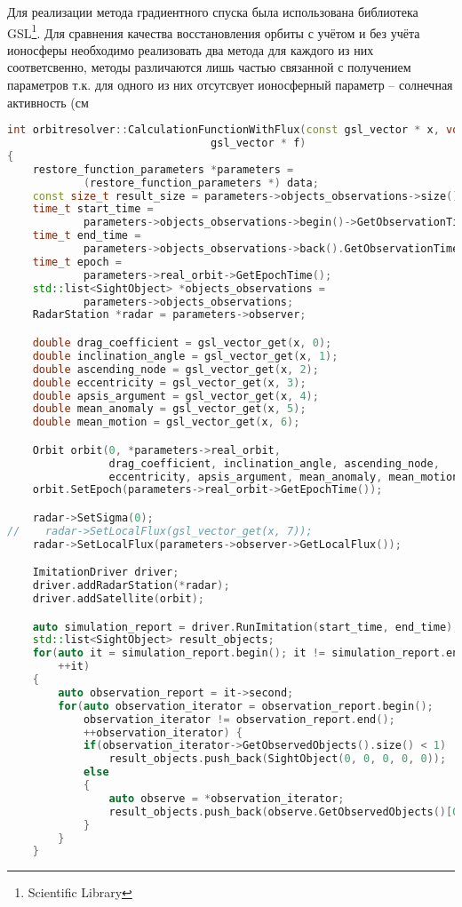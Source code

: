 Для реализации метода градиентного спуска была использована библиотека GSL\footnote{Scientific Library}. Для 
сравнения качества восстановления орбиты с учётом и без учёта ионосферы необходимо реализовать два метода для 
каждого из них соответсвенно, методы различаются лишь частью связанной с получением параметров т.к. для одного из
них отсутсвует ионосферный параметр -- солнечная активность (см
\begin{lstlisting}[language=C++, basicstyle=\fontsize{10}{9}\ttfamily,
	caption={Добавление случайной велечины к измеренной},label={lst:RandomizeValue}]
int orbitresolver::CalculationFunctionWithFlux(const gsl_vector * x, void *data,
                                gsl_vector * f)
{
    restore_function_parameters *parameters =
            (restore_function_parameters *) data;
    const size_t result_size = parameters->objects_observations->size();
    time_t start_time =
            parameters->objects_observations->begin()->GetObservationTime();
    time_t end_time =
            parameters->objects_observations->back().GetObservationTime();
    time_t epoch =
            parameters->real_orbit->GetEpochTime();
    std::list<SightObject> *objects_observations =
            parameters->objects_observations;
    RadarStation *radar = parameters->observer;

    double drag_coefficient = gsl_vector_get(x, 0);
    double inclination_angle = gsl_vector_get(x, 1);
    double ascending_node = gsl_vector_get(x, 2);
    double eccentricity = gsl_vector_get(x, 3);
    double apsis_argument = gsl_vector_get(x, 4);
    double mean_anomaly = gsl_vector_get(x, 5);
    double mean_motion = gsl_vector_get(x, 6);

    Orbit orbit(0, *parameters->real_orbit,
                drag_coefficient, inclination_angle, ascending_node,
                eccentricity, apsis_argument, mean_anomaly, mean_motion);
    orbit.SetEpoch(parameters->real_orbit->GetEpochTime());

    radar->SetSigma(0);
//    radar->SetLocalFlux(gsl_vector_get(x, 7));
    radar->SetLocalFlux(parameters->observer->GetLocalFlux());

    ImitationDriver driver;
    driver.addRadarStation(*radar);
    driver.addSatellite(orbit);

    auto simulation_report = driver.RunImitation(start_time, end_time);
    std::list<SightObject> result_objects;
    for(auto it = simulation_report.begin(); it != simulation_report.end();
        ++it)
    {
        auto observation_report = it->second;
        for(auto observation_iterator = observation_report.begin();
            observation_iterator != observation_report.end();
            ++observation_iterator) {
            if(observation_iterator->GetObservedObjects().size() < 1)
                result_objects.push_back(SightObject(0, 0, 0, 0, 0));
            else
            {
                auto observe = *observation_iterator;
                result_objects.push_back(observe.GetObservedObjects()[0]);
            }
        }
    }


\end{lstlisting}
